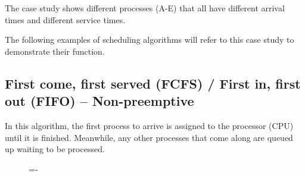\documentclass[a4paper]{systems-software}
\begin{document}
The case study shows different processes (A-E) that all have different arrival times and different service times.

The following examples of scheduling algorithms will refer to this case study to demonstrate their function.


\subsection*{First come, first served (FCFS) / First in, first out (FIFO) – Non-preemptive}

In this algorithm, the first process to arrive is assigned to the processor (CPU) until it is finished. Meanwhile, any other processes that come along are queued up waiting to be processed.

\begin{figure}[H]
  \lineskip=-\fboxrule
\end{figure}
\end{document}
